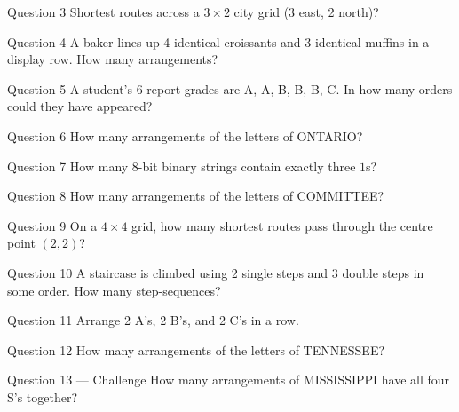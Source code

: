 \documentclass[11pt]{article}
\begin{document}
\begin{qbox}{Question 3}
Shortest routes across a $3\times2$ city grid (3 east, 2 north)?\workspace{2.4cm}
\end{qbox}

\begin{qbox}{Question 4}
A baker lines up 4 identical croissants and 3 identical muffins in a display row. How many arrangements?\workspace{2.4cm}
\end{qbox}

\begin{qbox}{Question 5}
A student's 6 report grades are A, A, B, B, B, C. In how many orders could they have appeared?\workspace{2.4cm}
\end{qbox}

\begin{qbox}{Question 6}
How many arrangements of the letters of ONTARIO?\workspace{2.4cm}
\end{qbox}

\begin{qbox}{Question 7}
How many 8-bit binary strings contain exactly three $1$s?\workspace{2.4cm}
\end{qbox}

\begin{qbox}{Question 8}
How many arrangements of the letters of COMMITTEE?\workspace{2.4cm}
\end{qbox}

\begin{qbox}{Question 9}
On a $4\times4$ grid, how many shortest routes pass through the centre point $(2,2)$?\workspace{2.4cm}
\end{qbox}

\begin{qbox}{Question 10}
A staircase is climbed using 2 single steps and 3 double steps in some order. How many step-sequences?\workspace{2.4cm}
\end{qbox}

\begin{qbox}{Question 11}
Arrange 2 A's, 2 B's, and 2 C's in a row.\workspace{2.4cm}
\end{qbox}

\begin{qbox}{Question 12}
How many arrangements of the letters of TENNESSEE?\workspace{2.4cm}
\end{qbox}

\begin{qbox}{Question 13 --- Challenge}
How many arrangements of MISSISSIPPI have all four S's together?\workspace{3cm}
\end{qbox}
\end{document}
